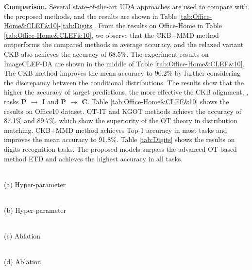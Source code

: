 \documentclass[final]{cvpr}
\begin{document}
\textbf{Comparison.} Several state-of-the-art UDA approaches are used to compare with the proposed methods, and the results are shown in Table \ref{tab:Office-Home&CLEF&10}-\ref{tab:Digits}. From the results on Office-Home in Table \ref{tab:Office-Home&CLEF&10}, we observe that the CKB+MMD method outperforms the compared methods in average accuracy, and the relaxed variant CKB also achieves the accuracy of 68.5\%. The experiment results on ImageCLEF-DA are shown in the middle of Table \ref{tab:Office-Home&CLEF&10}. The CKB method improves the mean accuracy to 90.2\% by further considering the discrepancy between the conditional distributions. The results show that the higher the accuracy of target predictions, the more effective the CKB alignment, \eg, tasks \textbf{P $\to$ I} and \textbf{P $\rightarrow$ C}. Table \ref{tab:Office-Home&CLEF&10} shows the results on Office10 dataset. OT-IT and KGOT methods achieve the accuracy of 87.1\% and 89.7\%, which show the superiority of the OT theory in distribution matching. CKB+MMD method achieves Top-1 accuracy in most tasks and improves the mean accuracy to 91.8\%. Table \ref{tab:Digits} shows the results on digits recognition tasks. The proposed models surpass the advanced OT-based method ETD and achieves the highest accuracy in all tasks.

\begin{figure*}[t]
    \begin{minipage}{0.245\linewidth}
         \\
        (a) Hyper-parameter
    \end{minipage}
    \hfill
    \begin{minipage}{0.245\linewidth}
         \\
        (b) Hyper-parameter
    \end{minipage}
    \hfill
    \begin{minipage}{0.245\linewidth}
         \\
        (c) Ablation
    \end{minipage}
    \hfill
    \begin{minipage}{0.245\linewidth}
         \\
        (d) Ablation
    \end{minipage}
       \caption{(a)-(b): Grid search for hyper-parameters $\lambda_1$ and $\lambda_2$. (c)-(d): Ablation analysis.}
    \label{fig:Hyper&Ablation}
    \vspace{-1pt}
    \end{figure*}
\end{document}

